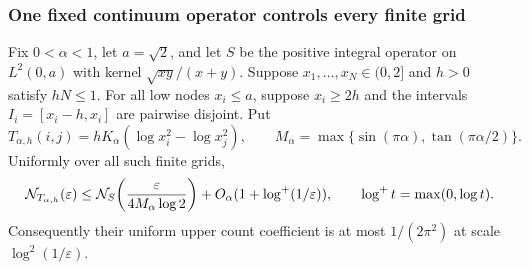 \subsubsection{One fixed continuum operator controls every finite grid}
\begin{lemma}\label{deg:lem:cell-grid}
Fix $0<\alpha<1$, let $a=\sqrt2$, and let $S$ be the positive integral
operator on $L^2(0,a)$ with kernel $\sqrt{xy}/(x+y)$.
Suppose $x_1,\ldots,x_N\in(0,2]$ and $h>0$ satisfy $hN\le1$.
For all low nodes $x_i\le a$, suppose $x_i\ge2h$ and the intervals
$I_i=[x_i-h,x_i]$ are pairwise disjoint. Put
\[
 T_{\alpha,h}(i,j)=hK_\alpha(\log x_i^2-\log x_j^2),\qquad
 M_\alpha=\max\{\sin(\pi\alpha),\tan(\pi\alpha/2)\}.
\]
Uniformly over all such finite grids,
\[
 \mathcal N_{T_{\alpha,h}}(\varepsilon)
 \le\mathcal N_S\!\left(\frac{\varepsilon}{4M_\alpha\log2}\right)
       +O_\alpha(1+\log^+(1/\varepsilon)),
 \qquad \log^+t=\max(0,\log t).
\]
Consequently their uniform upper count coefficient is at most
$1/(2\pi^2)$ at scale $\log^2(1/\varepsilon)$.
\end{lemma}
